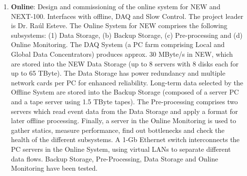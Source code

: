 \begin{enumerate}
\item {\bf Online}: Design and commissioning of the online system for NEW and NEXT-100. Interfaces with offline, DAQ and Slow Control. The project leader is Dr. Raúl Esteve. The Online System for NEW comprises the following subsystems: (1) Data Storage, (b) Backup Storage, (c) Pre-processing and (d) Online Monitoring. The DAQ System (a PC farm comprising Local and Global Data Concentrators) produces approx. 30 MByte/s in NEW, which are stored into the NEW Data Storage (up to 8 servers with 8 disks each for up to 65 TByte). The Data Storage has power redundancy and multiple network cards per PC for enhanced reliability. Long-term data selected by the Offline System are stored into the Backup Storage (composed of a server PC and a tape server using 1.5 TByte tapes). The Pre-processing comprises two servers which read event data from the Data Storage and apply a format for later offline processing. Finally, a server in the Online Monitoring is used to gather statics, measure performance, find out bottlenecks and check the health of the different subsystems. A 1-Gb Ethernet switch interconnects the PC servers in the Online System, using virtual LANs to separate different data flows.
Backup Storage, Pre-Processing, Data Storage and Online Monitoring have been tested.

\end{enumerate}

